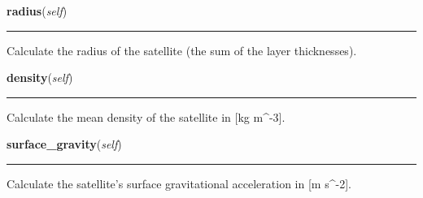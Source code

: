     \vspace{0.5ex}

\hspace{.8\funcindent}\begin{boxedminipage}{\funcwidth}

    \raggedright \textbf{radius}(\textit{self})

    \vspace{-1.5ex}

    \rule{\textwidth}{0.5\fboxrule}
\setlength{\parskip}{2ex}
    Calculate the radius of the satellite (the sum of the layer 
    thicknesses).

\setlength{\parskip}{1ex}
    \end{boxedminipage}

    \label{SatStress:SatStress:Satellite:density}

    \vspace{0.5ex}

\hspace{.8\funcindent}\begin{boxedminipage}{\funcwidth}

    \raggedright \textbf{density}(\textit{self})

    \vspace{-1.5ex}

    \rule{\textwidth}{0.5\fboxrule}
\setlength{\parskip}{2ex}
    Calculate the mean density of the satellite in [kg 
    m{\textasciicircum}-3].

\setlength{\parskip}{1ex}
    \end{boxedminipage}

    \label{SatStress:SatStress:Satellite:surface_gravity}

    \vspace{0.5ex}

\hspace{.8\funcindent}\begin{boxedminipage}{\funcwidth}

    \raggedright \textbf{surface\_gravity}(\textit{self})

    \vspace{-1.5ex}

    \rule{\textwidth}{0.5\fboxrule}
\setlength{\parskip}{2ex}
    Calculate the satellite's surface gravitational acceleration in [m 
    s{\textasciicircum}-2].

\setlength{\parskip}{1ex}
    \end{boxedminipage}

